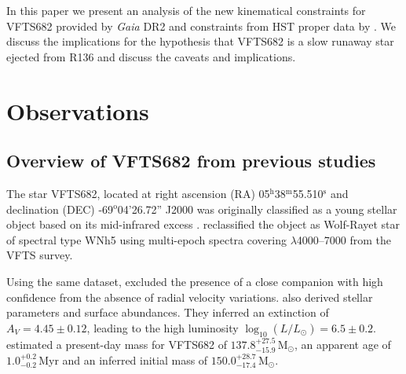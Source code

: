 \documentclass[apjl,twocolumn]{emulateapj}
\newcommand{\Msun}{{\,\mathrm{M}_\odot}}
\DeclareRobustCommand{\Tabref}[1]{Table~\ref{#1}}
\begin{document}
In this paper we present an analysis of the new kinematical constraints for VFTS682 provided by \emph{Gaia} DR2 and constraints from HST proper data  by \citet{platais:18}.   We discuss the implications for the hypothesis that VFTS682 is a slow runaway star ejected from R136 and discuss the caveats and implications.  





\section{Observations}
\label{sec:sample}

\subsection{ Overview of VFTS682 from previous studies \label{data:vfts683}}

The star VFTS682, located at right ascension (RA)
05$^\mathrm{h}$38$^\mathrm{m}$55.510$^\mathrm{s}$  and declination
(DEC) \mbox{-69$^\mathrm{o}$04'26.72''} J2000 \citep[][%
]{evans:11}
was originally classified as a young stellar object based on its
mid-infrared excess \citep{gruendl:09}. \citet{evans:11} reclassified the
object as Wolf-Rayet star of spectral type WNh5 using multi-epoch
spectra covering $\lambda$4000--7000 from the
VFTS survey. %

Using the same dataset,
\citet{bestenlehner:11} excluded the presence of a close companion
with high confidence from the absence of radial velocity variations.
\citet{bestenlehner:11} %
also derived stellar
parameters and surface abundances. They inferred an extinction
of $A_V=4.45\pm0.12$, leading to the high luminosity
$\log_{10}(L/L_\odot) =  6.5\pm0.2$. \citet{schneider:18} estimated
a present-day mass for VFTS682 of $137.8^{+27.5}_ {-15.9}\Msun$, an
apparent age of $1.0^{+0.2}_{-0.2}$\,Myr and an inferred initial mass
of $150.0^{+28.7}_{-17.4}\Msun$.%
\end{document}
